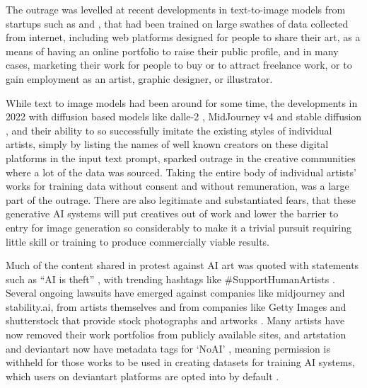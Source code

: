 The outrage was levelled at recent developments in text-to-image models from startups such as \cite{midjourney2023midjourney} and \cite{stability2023stability} , that had been trained on large swathes of data collected from internet, including web platforms designed for people to share their art, as a means of having an online portfolio to raise their public profile, and in many cases, marketing their work for people to buy or to attract freelance work, or to gain employment as an artist, graphic designer, or illustrator.

While text to image models had been around for some time, the developments in 2022 with diffusion based models like dalle-2 \citep{openai2022dalle2}, MidJourney v4 \citep{edwards2022midjourney} and stable diffusion \citep{stability2022stable}, and their ability to so successfully imitate the existing styles of individual artists, simply by listing the names of well known creators on these digital platforms in the input text prompt, sparked outrage in the creative communities where a lot of the data was sourced. 
Taking the entire body of individual artists' works for training data without consent and without remuneration, was a large part of the outrage.
There are also legitimate and substantiated fears, that these generative AI systems will put creatives out of work and lower the barrier to entry for image generation so considerably to make it a trivial pursuit requiring little skill or training to produce commercially viable results.

Much of the content shared in protest against AI art was quoted with statements such as “AI is theft” \citep{whiddington2022backlash}, with trending hashtags like \#SupportHumanArtists \citep{zakuga2022theft}. 
Several ongoing lawsuits have emerged against companies like midjourney and stability.ai, from artists themselves \citep{brittain2023artists} and from companies like Getty Images and shutterstock that provide stock photographs and artworks \citep{vincent2023getty}. 
Many artists have now removed their work portfolios from publicly available sites, and artstation and deviantart now have metadata tags for ‘NoAI’ \citep{artstation2022noai}, meaning permission is withheld for those works to be used in creating datasets for training AI systems, which users on deviantart platforms are opted into by default \citep{deviantart2022optout}. 


